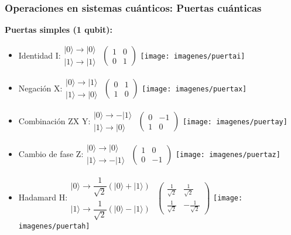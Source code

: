 \documentclass{beamer}
\newcommand{\filados}[2]{ \left. \begin{array}{c}	#1 \\	#2	 \end{array} \right. }
\newcommand{\base}[1]{|#1\rangle}
\newcommand{\puertai}{\texttt{[image: imagenes/puertai]}}
\newcommand{\puertax}{\texttt{[image: imagenes/puertax]}}
\newcommand{\puertay}{\texttt{[image: imagenes/puertay]}}
\newcommand{\puertaz}{\texttt{[image: imagenes/puertaz]}}
\newcommand{\puertah}{\texttt{[image: imagenes/puertah]}}
\begin{document}
\begin{frame}
	\frametitle{Operaciones en sistemas cuánticos: Puertas cuánticas}
	\textbf{Puertas simples (1 qubit):}
	\begin{itemize}
	\item Identidad I:$\filados{\base0\to\base0}{\base1\to\base1}$
	$\left({\begin{array}{cc}1&0\\0&1\end{array} } \right)$ \puertai
	
	\item Negación X:$\filados{\base0\to\base1}{\base1\to\base0}$
	$\left({\begin{array}{cc}0&1\\1&0\end{array} } \right)$ \puertax
	
	\item Combinación ZX Y:$\filados{\base0\to-\base{1}}{\base1\to\base0}$
	$\left({\begin{array}{cc}0&-1\\1&0\end{array} } \right)$ \puertay
	
	\item Cambio de fase Z:$\filados{\base0\to\base0}{\base1\to-\base1}$ 
	$\left({\begin{array}{cc}1&0\\0&-1\end{array} } \right)$ \puertaz
	
	\item Hadamard H:$\filados{\base0\to\dfrac{1}{\sqrt{2}}(\base0 + \base1)}{\base1\to\dfrac{1}{\sqrt{2}}(\base0 - \base1)}$ 
	$\left({\begin{array}{cc}\frac{1}{\sqrt{2}}&\frac{1}{\sqrt{2}}\\\frac{1}{\sqrt{2}}&-\frac{1}{\sqrt{2}}\end{array} } \right)$ \puertah
	\end{itemize}
\end{frame}
\end{document}
